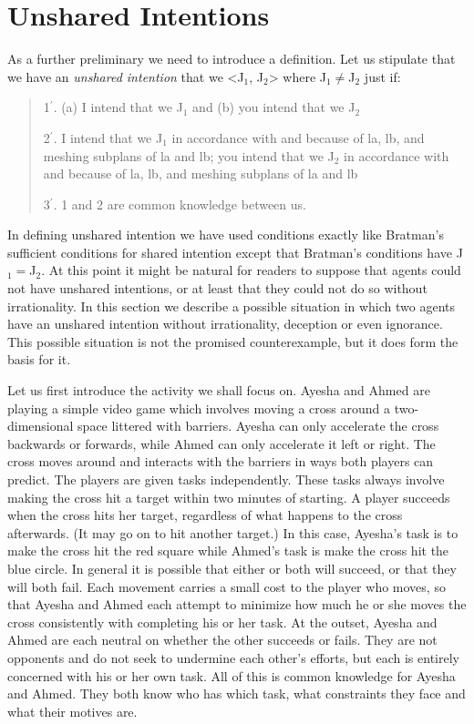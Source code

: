 \documentclass[12pt,\papersize]{extarticle}
\begin{document}
\section{Unshared Intentions}
\label{sec:unshared_intentions}
As a further preliminary we need to introduce a definition.
Let us stipulate that we have an \emph{unshared intention} that we <J$_1$, J$_2$> where J$_1$$\neq$J$_2$ just if:
%
\begin{quote}
\label{df:unshared_intention}
1$^\prime$. (a) I intend that we J$_1$ and (b) you intend that we J$_2$
 
2$^\prime$. I intend that we J$_1$ in accordance with and because of la, lb, and meshing subplans of la and lb; you intend that we J$_2$ in accordance with and because of la, lb, and meshing subplans of la and lb
 
3$^\prime$. 1 and 2 are common knowledge between us.
\end{quote}
In defining unshared intention we have used conditions exactly like Bratman's sufficient conditions for shared intention except that Bratman's conditions have J$_1$$=$J$_2$.
At this point it might be natural for readers to suppose that agents could not have unshared intentions,
or at least that they could not do so without irrationality.
In this section we describe a possible situation in which two agents  have an unshared intention without irrationality, deception or even ignorance.
This possible situation is not the promised counterexample, but it does form the basis for it.

Let us first introduce the activity we shall focus on.
Ayesha and Ahmed  are playing a simple video game which involves moving a cross around a two-dimensional space littered with barriers.
Ayesha can only accelerate the cross backwards or forwards,
while Ahmed can only accelerate it left or right. 
The cross moves around and interacts with the barriers in ways both players can predict.
The players are given tasks independently. 
These tasks always involve making the cross hit a target within two minutes of starting. 
A player succeeds when the cross hits her target, regardless of what happens to the cross afterwards.  
(It may go on to hit another target.)
In this case, 
	Ayesha's task is to make the cross hit the red square
	while
	Ahmed's task is make the cross hit the blue circle. 
In general it is possible that either or both will succeed, or that they will both fail.
Each movement carries a small cost to the player who moves, so that Ayesha and Ahmed each attempt to minimize how much he or she moves the cross consistently with completing his or her task.
At the outset, 
Ayesha and Ahmed are each neutral on whether the other succeeds or fails.
They are not opponents and do not seek to undermine each other's efforts, but each is entirely concerned  with his or her own task.
All of this is common knowledge for Ayesha and Ahmed.
They both know who has which task, what constraints they face and what their motives are.
\end{document}
